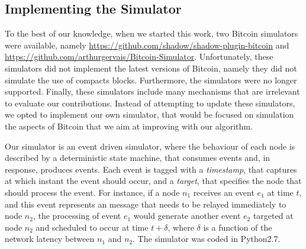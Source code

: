 %

\subsection{Implementing the Simulator}

To the best of our knowledge, when we started this work, two Bitcoin simulators were available, namely \url{https://github.com/shadow/shadow-plugin-bitcoin} and \url{https://github.com/arthurgervais/Bitcoin-Simulator}. Unfortunately, these simulators did not implement the latest versions of Bitcoin, namely they did not simulate the use of compacts blocks. Furthermore, the simulators were no longer supported. Finally, these simulators include many mechanisms that are irrelevant to evaluate our contributions. Instead of attempting to update these simulators, we opted to implement our own simulator, that would be focused on simulation the aspects of Bitcoin that we aim at improving with our algorithm.

Our simulator is an event driven simulator, where the behaviour of each node is described by a deterministic state machine, that consumes events and, in response, produces events. Each event is tagged with a \textit{timestamp}, that captures at which instant the event should occur, and a \textit{target}, that specifies the node that should process the event. For instance, if a node $n_1$ receives an event $e_1$ at time $t$, and this event represents an message that needs to be relayed immediately to node $n_2$, the  processing of event $e_1$ would generate another event $e_2$ targeted at node $n_2$ and scheduled to occur at time $t+\delta$, where $\delta$ is a function of the network latency between $n_1$ and $n_2$. The simulator was coded in Python2.7.

